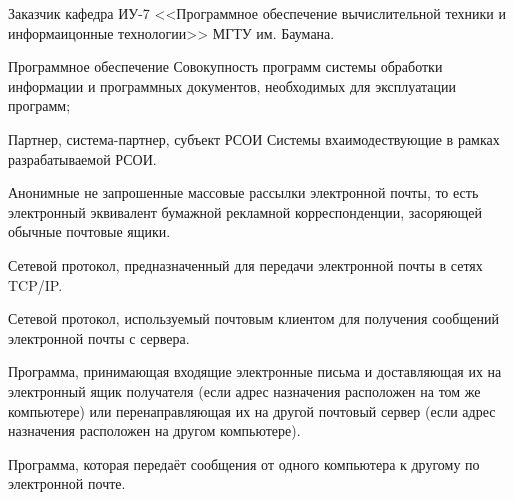 \Defines %
\begin{description}
\item{Заказчик} кафедра ИУ-7 <<Программное обеспечение вычислительной техники и информаицонные технологии>> МГТУ им. Баумана.
\item{Программное обеспечение} Совокупность программ системы обработки информации и программных документов, необходимых для эксплуатации программ;
\item{Партнер, система-партнер, субъект РСОИ} Системы вхаимодествующие в рамках разрабатываемой РСОИ.
\item[Спам] Анонимные не запрошенные массовые рассылки электронной почты, то есть электронный эквивалент бумажной рекламной корреспонденции, засоряющей обычные почтовые ящики.
\item[SMTP] Сетевой протокол, предназначенный для передачи электронной почты в сетях TCP/IP.
\item[POP3] Сетевой протокол, используемый почтовым клиентом для получения сообщений электронной почты с сервера.
\item[MDA] Программа, принимающая входящие электронные письма и доставляющая их на электронный ящик получателя (если адрес назначения расположен на том же компьютере) или перенаправляющая их на другой почтовый сервер (если адрес назначения расположен на другом компьютере).
\item[MTA] Программа, которая передаёт сообщения от одного компьютера к другому по электронной почте.
\
\end{description}

